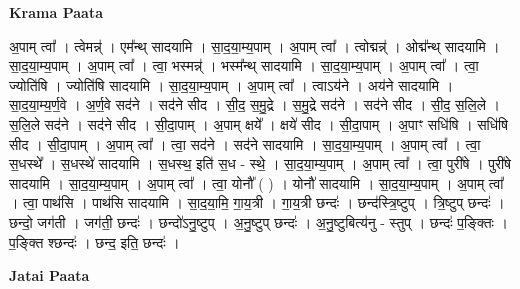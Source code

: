 \documentclass[17pt]{extarticle}
\begin{document}
\textbf{Krama Paata} \newline

अ॒पाम् त्वा᳚ । त्वेमन्न्॑ । एम᳚न्थ् सादयामि । सा॒द॒या॒म्य॒पाम् । अ॒पाम् त्वा᳚ । त्वोद्मन्न्॑ । ओद्म᳚न्थ् सादयामि । सा॒द॒या॒म्य॒पाम् । अ॒पाम् त्वा᳚ । त्वा॒ भस्मन्न्॑ । भस्म᳚न्थ् सादयामि । सा॒द॒या॒म्य॒पाम् । अ॒पाम् त्वा᳚ । त्वा॒ ज्योति॑षि । ज्योति॑षि सादयामि । सा॒द॒या॒म्य॒पाम् । अ॒पाम् त्वा᳚ । त्वाऽय॑ने । अय॑ने सादयामि । सा॒द॒या॒म्य॒र्ण॒वे । अ॒र्ण॒वे सद॑ने । सद॑ने सीद । सी॒द॒ स॒मु॒द्रे । स॒मु॒द्रे सद॑ने । सद॑ने सीद । सी॒द॒ स॒लि॒ले । स॒लि॒ले सद॑ने । सद॑ने सीद । सी॒दा॒पाम् । अ॒पाम् क्षये᳚ । क्षये॑ सीद । सी॒दा॒पाम् । अ॒पाꣳ सधि॑षि । सधि॑षि सीद । सी॒दा॒पाम् । अ॒पाम् त्वा᳚ । त्वा॒ सद॑ने । सद॑ने सादयामि । सा॒द॒या॒म्य॒पाम् । अ॒पाम् त्वा᳚ । त्वा॒ स॒धस्थे᳚ । स॒धस्थे॑ सादयामि । स॒धस्थ॒ इति॑ स॒ध - स्थे॒ । सा॒द॒या॒म्य॒पाम् । अ॒पाम् त्वा᳚ । त्वा॒ पुरी॑षे । पुरी॑षे सादयामि । सा॒द॒या॒म्य॒पाम् । अ॒पाम् त्वा᳚ । त्वा॒ योनौ᳚ ( ) । योनौ॑ सादयामि । सा॒द॒या॒म्य॒पाम् । अ॒पाम् त्वा᳚ । त्वा॒ पाथ॑सि । पाथ॑सि सादयामि । सा॒द॒या॒मि॒ गा॒य॒त्री । गा॒य॒त्री छन्दः॑ । छन्द॑स्त्रि॒ष्टुप् । त्रि॒ष्टुप् छन्दः॑ । छन्दो॒ जग॑ती । जग॑ती॒ छन्दः॑ । छन्दो॑ऽनु॒ष्टुप् । अ॒नु॒ष्टुप् छन्दः॑ । अ॒नु॒ष्टुबित्य॑नु - स्तुप् । छन्दः॑ प॒ङ्क्तिः । प॒ङ्क्ति श्छन्दः॑ । छन्द॒ इति॒ छन्दः॑ । \newline

\textbf{Jatai Paata} \newline
\end{document}
